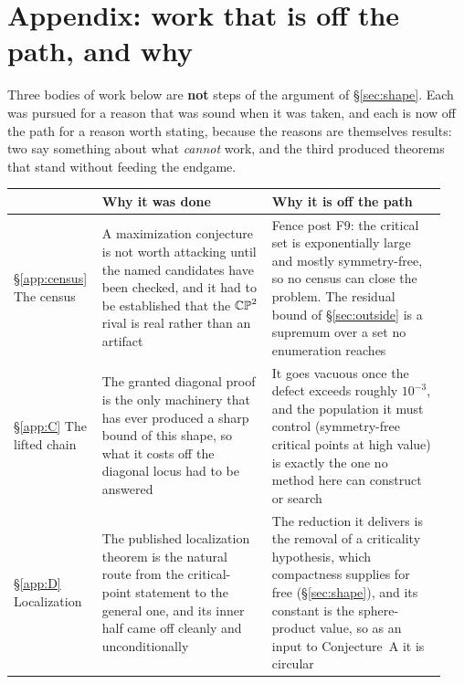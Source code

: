\appendix
\section*{Appendix: work that is off the path, and why}

Three bodies of work below are \textbf{not} steps of the argument of \S\ref{sec:shape}. Each was pursued for a reason that was sound when it was taken, and each is now off the path for a reason worth stating, because the reasons are themselves results: two say something about what \emph{cannot} work, and the third produced theorems that stand without feeding the endgame.

\begin{center}
\begin{tabular}{@{}p{0.17\linewidth}p{0.38\linewidth}p{0.39\linewidth}@{}}
\toprule
& \textbf{Why it was done} & \textbf{Why it is off the path} \\
\midrule
\S\ref{app:census} \newline The census & A maximization conjecture is not worth attacking until the named candidates have been checked, and it had to be established that the $\mathbb{CP}^2$ rival is real rather than an artifact & Fence post F9: the critical set is exponentially large and mostly symmetry-free, so no census can close the problem. The residual bound of \S\ref{sec:outside} is a supremum over a set no enumeration reaches \\
\addlinespace
\S\ref{app:C} \newline The lifted chain & The granted diagonal proof is the only machinery that has ever produced a sharp bound of this shape, so what it costs off the diagonal locus had to be answered & It goes vacuous once the defect exceeds roughly $10^{-3}$, and the population it must control (symmetry-free critical points at high value) is exactly the one no method here can construct or search \\
\addlinespace
\S\ref{app:D} \newline Localization & The published localization theorem is the natural route from the critical-point statement to the general one, and its inner half came off cleanly and unconditionally & The reduction it delivers is the removal of a criticality hypothesis, which compactness supplies for free (\S\ref{sec:shape}), and its constant is the sphere-product value, so as an input to Conjecture~A it is circular \\
\bottomrule
\end{tabular}
\end{center}


